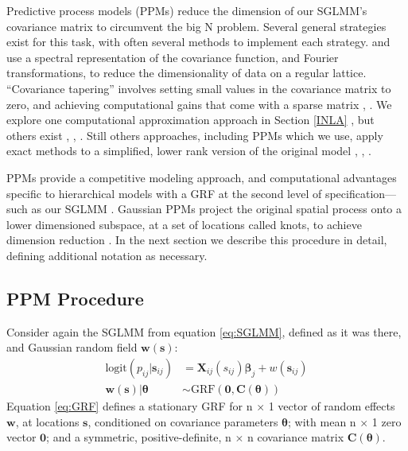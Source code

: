Predictive process models (PPMs) reduce the dimension of our SGLMM's covariance matrix to circumvent the big N problem. Several general strategies exist for this task, with often several methods to implement each strategy. \cite{Fuentes2007} and \cite{Paciorek2007} use a spectral representation of the covariance function, and Fourier transformations, to reduce the dimensionality of data on a regular lattice. ``Covariance tapering'' involves setting small values in the covariance matrix to zero, and achieving computational gains that come with a sparse matrix \citep{Furrer2006}, \citep{Kaufman2008}. We explore one computational approximation approach in Section \ref{INLA} \citep{Rue2009}, but others exist \citep{Stein2004}, \citep{Eidsvik2014}, \citep{Aune2014}. Still others approaches, including PPMs which we use, apply exact methods to a simplified, lower rank version of the original model \citep{Cressie2008}, \citep{Higdon2002}, \citep{Eidsvik2012}.

PPMs provide a competitive modeling approach, and computational advantages specific to hierarchical models with a GRF at the second level of specification---such as our SGLMM \citep{Banerjee2008}. Gaussian PPMs project the original spatial process onto a lower dimensioned subspace, at a set of locations called knots, to achieve dimension reduction \citep{Banerjee2008}. In the next section we describe this procedure in detail, defining additional notation as necessary.

\subsection{PPM Procedure}
Consider again the SGLMM from equation \ref{eq:SGLMM}, defined as it was there, and Gaussian random field $\pmb{w}(\pmb{s})$:
\begin{align}
\text{logit}(p_{ij}|\pmb{s}_{ij}) &= \pmb{X}_{ij}(s_{ij}) \pmb{\beta}_{j} + w(\pmb{s}_{ij}) \label{eq:ppm} \\
\pmb{w}(\pmb{s}) | \pmb{\theta} &\sim \text{GRF}(\pmb{0}, \pmb{C}(\pmb{\theta})) \label{eq:GRF}
\end{align}
Equation \ref{eq:GRF} defines a stationary GRF for n $\times$ 1 vector of random effects $\pmb{w}$, at locations $\pmb{s}$, conditioned on covariance parameters $\pmb{\theta}$; with mean  n $\times$ 1 zero vector $\pmb{0}$; and a symmetric, positive-definite, n $\times$ n covariance matrix $\pmb{C}(\pmb{\theta})$.

